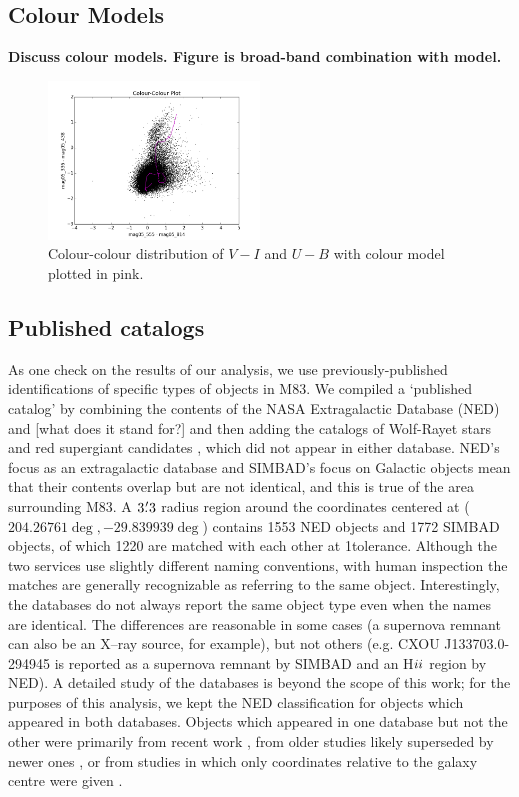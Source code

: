 \subsection{Colour Models}
\textbf{Discuss colour models. Figure is broad-band combination with model.}

\begin{figure}
\label{fig:model_colour}
\centering
\includegraphics[width=0.5\textwidth]{figs/data/plot_mag05_555-mag05_814vsmag05_336-mag05_438}
\caption{Colour-colour distribution of $V - I$ and $U - B$ with colour model plotted in pink.}
\end{figure}


\subsection{Published catalogs}

As one check on the results of our analysis, we use previously-published identifications of specific types of objects in M83.
We compiled a `published catalog' by combining the contents of the NASA Extragalactic Database (NED) and
[what does it stand for?] \citep[SIMBAD][]{wenger2000} and then adding the catalogs of Wolf-Rayet stars \citep{kim12} and
red supergiant candidates \citep{williams15}, which did not appear in either database.
NED's focus as an extragalactic database and SIMBAD's focus on Galactic objects mean that their contents overlap but are not identical, 
and this is true of the area surrounding M83. A $3\hbox{$.\mkern-4mu^\prime$}3$ radius region around the coordinates centered at  ($204.26761\deg, -29.839939\deg$)
contains 1553 NED objects and 1772 SIMBAD objects, of which 1220 are matched with each other at 1\arcsec tolerance.
Although the two services use slightly different naming conventions, with human inspection the matches are generally recognizable as referring
to the same object. Interestingly, the databases do not always report the same object type even when the names are identical.
The differences are reasonable in some cases (a supernova remnant can also be an X--ray source, for example), but not others
(e.g. CXOU J133703.0-294945 is reported as a supernova remnant by SIMBAD and an H${\sc ii}$  region by NED).
A detailed study of the databases is beyond the scope of this work; for the purposes of this analysis, we kept the NED classification
for objects which appeared in both databases.
Objects which appeared in one database but not the other were primarily from recent work \citep[e.g.][]{long2014}, from
older studies likely superseded by newer ones \citep[e.g.][]{larsen1999}, or from studies in which only coordinates relative to
the galaxy centre were given \citep{rumstay83,dvpd83}.

